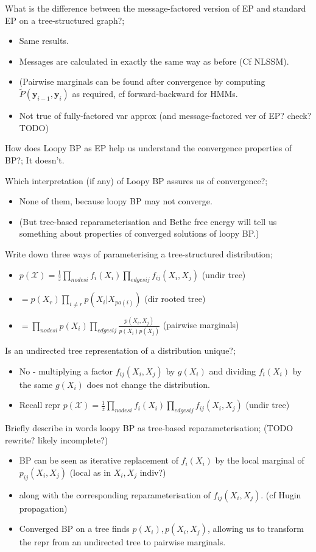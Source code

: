 \documentclass{article}
\begin{document}
What is the difference between the message-factored version of EP and standard EP on a tree-structured graph?; \begin{itemize} \item Same results.  \item Messages are calculated in exactly the same way as before (Cf NLSSM). \item (Pairwise marginals can be found after convergence by computing $\tilde{P}(\mathbf{y}_{i-1}, \mathbf{y}_i)$ as required, cf forward-backward for HMMs. \item Not true of fully-factored var approx (and message-factored ver of EP? check? TODO) \end{itemize}

How does Loopy BP as EP help us understand the convergence properties of BP?; It doesn't.

Which interpretation (if any) of Loopy BP assures us of convergence?; \begin{itemize} \item None of them, because loopy BP may not converge. \item (But tree-based reparameterisation and Bethe free energy will tell us something about properties of converged solutions of loopy BP.) \end{itemize} 

Write down three ways of parameterising a tree-structured distribution; \begin{itemize} \item $p(\mathcal{X}) = \frac{1}{z}\prod_{nodes i}f_i(X_i)\prod_{edges ij}f_{ij}(X_i, X_j)$ (undir tree) \item $= p(X_r)\prod_{i \ne r} p(X_i|X_{pa(i)})$ (dir rooted tree) \item $=\prod_{nodes i}p(X_i)\prod_{edges ij}\frac{p(X_i, X_j)}{p(X_i)p(X_j)}$ (pairwise marginals) \end{itemize}

Is an undirected tree representation of a distribution unique?; \begin{itemize} \item No - multiplying a factor $f_{ij}(X_i, X_j)$ by $g(X_i)$ and dividing $f_i(X_i)$ by the same $g(X_i)$ does not change the distribution. \item Recall repr $p(\mathcal{X}) = \frac{1}{z}\prod_{nodes i}f_i(X_i)\prod_{edges ij}f_{ij}(X_i, X_j)$ (undir tree) \end{itemize}

Briefly describe in words loopy BP as tree-based reparameterisation; (TODO rewrite? likely incomplete?) \begin{itemize} \item BP can be seen as iterative replacement of $f_i(X_i)$ by the local marginal of $p_{ij}(X_i, X_j)$ (local as in $X_i, X_j$ indiv?) \item along with the corresponding reparameterisation of $f_{ij}(X_i, X_j)$. (cf Hugin propagation) \item Converged BP on a tree finds $p(X_i), p(X_i, X_j)$, allowing us to transform the repr from an undirected tree to pairwise marginals. \end{itemize}
\end{document}
